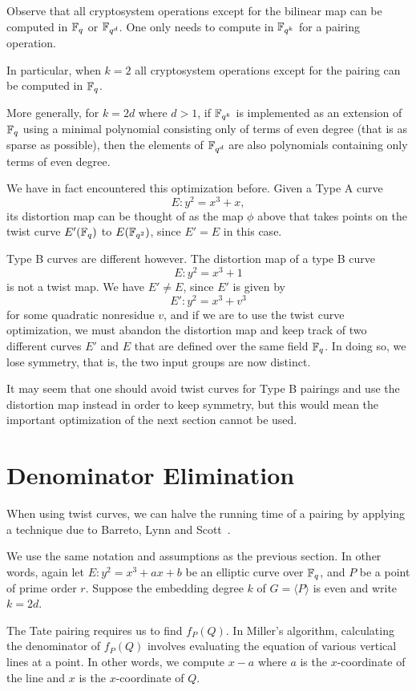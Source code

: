 Observe that all cryptosystem operations except for the bilinear map
can be computed in $\mathbb{F}_q$ or $\mathbb{F}_{q^d}$.
One only needs to compute in $\mathbb{F}_{q^k}$ for a pairing operation.

In particular,
when $k=2$ all cryptosystem operations except for the pairing
can be computed in $\mathbb{F}_q$.

More generally, for $k=2d$ where $d > 1$,
if $\mathbb{F}_{q^k}$ is implemented as an extension of $\mathbb{F}_q$ using
a minimal polynomial consisting only of terms of even degree (that is as
sparse as possible),
then the elements of $\mathbb{F}_{q^d}$ are also polynomials containing only terms
of even degree.

We have in fact encountered this optimization before.
Given a Type A curve
\[E : y^2 = x^3 + x ,\]
its distortion map can be thought of as the
map $\phi$ above that takes points on the twist curve $E'(\mathbb{F}_q)$
to $E(\mathbb{F}_{q^2})$, since $E' = E$ in this case.

Type B curves are different however. The distortion map of a type B curve
\[E : y^2 = x^3 + 1\]
is not a twist map. We have $E' \ne E$, since $E'$ is given by
\[E' : y^2 = x^3 + v^3\]
for some quadratic nonresidue $v$,
and if we are to use
the twist curve optimization, we must abandon the distortion map and keep track
of two different curves $E'$ and $E$ that are defined over the same field
$\mathbb{F}_q$. In doing so, we lose symmetry, that is, the two input groups are now
distinct.

It may seem that one should avoid twist curves for Type B
pairings and use the distortion map instead in order to keep symmetry,
but this would mean the important optimization of the next section
cannot be used.

\section {\label{sec:denomelim}Denominator Elimination}

When using twist curves, we can halve the running time of a pairing by applying
a technique due to Barreto, Lynn and Scott~\cite{bals2}.

We use the same notation and assumptions as the previous section.
In other words, again let $E : y^2 = x^3 + a x + b$ be an elliptic curve
over $\mathbb{F}_q$,
and $P$ be a point of prime order $r$.
Suppose the embedding degree $k$ of $G = \langle P \rangle$ is even
and write $k = 2d$.

The Tate pairing requires us to find $f_P(Q)$.
In Miller's algorithm, calculating the denominator of
$f_P(Q)$ involves evaluating the equation of various vertical lines
at a point. In other words, we compute $x - a$ where $a$ is the
$x$-coordinate of the line and $x$ is the $x$-coordinate of $Q$.

